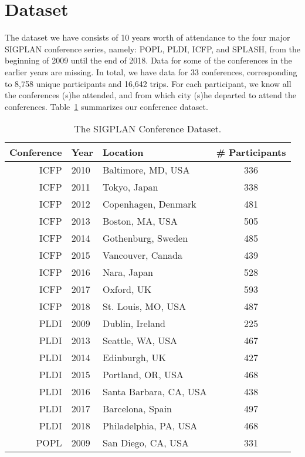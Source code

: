 \section{Dataset}

The dataset we have consists of 10 years worth of attendance to the four major SIGPLAN conference series, namely: POPL, PLDI, ICFP, and SPLASH, from the beginning of 2009 until the end of 2018. Data for some of the conferences in the earlier years are missing. In total, we have data for 33 conferences, corresponding to 8,758 unique participants and 16,642 trips. For each participant, we know all the conferences (s)he attended, and from which city (s)he departed to attend the conferences. Table~\ref{tab:dataset} summarizes our conference dataset.

\begin{table}%
    \centering
    \caption{The SIGPLAN Conference Dataset.}
    \label{tab:dataset}
    \begin{tabular}{r|l|l|c} \hline
        Conference  & Year & Location & \# Participants\\ \hline
        ICFP & 2010 & Baltimore, MD, USA & 336 \\
        ICFP & 2011 & Tokyo, Japan & 338 \\
        ICFP & 2012 & Copenhagen, Denmark & 481 \\
        ICFP & 2013 & Boston, MA, USA & 505 \\
        ICFP & 2014 & Gothenburg, Sweden & 485 \\
        ICFP & 2015 & Vancouver, Canada & 439 \\
        ICFP & 2016 & Nara, Japan & 528 \\
        ICFP & 2017 & Oxford, UK & 593 \\
        ICFP & 2018 & St. Louis, MO, USA & 487 \\ \hline
        PLDI & 2009 & Dublin, Ireland & 225 \\
        PLDI & 2013 & Seattle, WA, USA & 467 \\
        PLDI & 2014 & Edinburgh, UK & 427 \\
        PLDI & 2015 & Portland, OR, USA & 468 \\
        PLDI & 2016 & Santa Barbara, CA, USA & 438 \\
        PLDI & 2017 & Barcelona, Spain & 497 \\
        PLDI & 2018 & Philadelphia, PA, USA & 468 \\ \hline
        POPL & 2009 & San Diego, CA, USA & 331 \\

\end{tabular}
\end{table}
